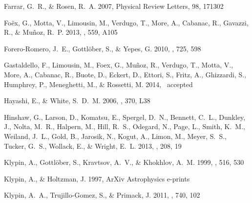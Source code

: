 \documentclass{emulateapj}
\begin{document}
\begin{thebibliography}{28}
{Farrar}, G.~R., \& {Rosen}, R.~A. 2007, Physical Review Letters, 98, 171302

{Fo{\"e}x}, G., {Motta}, V., {Limousin}, M., {Verdugo}, T., {More}, A.,
  {Cabanac}, R., {Gavazzi}, R., \& {Mu{\~n}oz}, R.~P. 2013, \aap, 559, A105

{Forero-Romero}, J.~E., {Gottl{\"o}ber}, S., \& {Yepes}, G. 2010, \apj, 725,
  598

{Gastaldello}, F., {Limousin}, M., {Foex}, G., {Mu\~noz}, R., {Verdugo}, T.,
  {Motta}, V., {More}, A., {Cabanac}, R., {Buote}, D., {Eckert}, D., {Ettori},
  S., {Fritz}, A., {Ghizzardi}, S., {Humphrey}, P., {Meneghetti}, M., \&
  {Rossetti}, M. 2014, \mnras\ accepted

{Hayashi}, E., \& {White}, S.~D.~M. 2006, \mnras, 370, L38

{Hinshaw}, G., {Larson}, D., {Komatsu}, E., {Spergel}, D.~N., {Bennett}, C.~L.,
  {Dunkley}, J., {Nolta}, M.~R., {Halpern}, M., {Hill}, R.~S., {Odegard}, N.,
  {Page}, L., {Smith}, K.~M., {Weiland}, J.~L., {Gold}, B., {Jarosik}, N.,
  {Kogut}, A., {Limon}, M., {Meyer}, S.~S., {Tucker}, G.~S., {Wollack}, E., \&
  {Wright}, E.~L. 2013, \apjs, 208, 19

{Klypin}, A., {Gottl{\"o}ber}, S., {Kravtsov}, A.~V., \& {Khokhlov}, A.~M.
  1999, \apj, 516, 530

{Klypin}, A., \& {Holtzman}, J. 1997, ArXiv Astrophysics e-prints

{Klypin}, A.~A., {Trujillo-Gomez}, S., \& {Primack}, J. 2011, \apj, 740, 102


\end{thebibliography}
\end{document}
